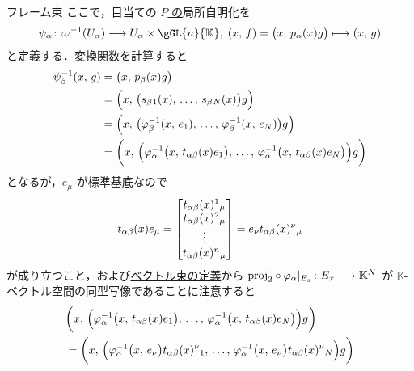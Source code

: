 \documentclass[TQFT_main]{subfiles}
\begin{document}
\begin{myexample}[label=def:framebundle]{フレーム束}
    ここで，目当ての \underline{$P$ の}局所自明化を
    \begin{align}
        \psi_\alpha \colon \varpi^{-1}(U_\alpha) \lto U_\alpha \times \gGL{n}{\mathbb{K}},\; (x,\, f) = \bigl(x,\, p_\alpha (x) g\bigr)\lmto (x,\, g)
    \end{align}
    と定義する．変換関数を計算すると
    \begin{align}
        \psi_\beta^{-1}(x,\, g) 
        &= \bigl(x,\, p_\beta (x) g\bigr) \\
        &= \Bigl(x,\, \bigl(s_\beta{}_1(x),\, \dots,\, s_\beta{}_N(x)\bigr) g\Bigr) \\
        &= \Bigl(x,\, \bigl(\varphi_\beta^{-1}(x,\, e_1),\, \dots,\, \varphi_\beta^{-1}(x,\, e_N)\bigr) g\Bigr) \\
        &= \biggl(x,\, \Bigl(\varphi_\alpha^{-1}\bigl(x,\, t_{\alpha\beta}(x) e_1\bigr),\, \dots,\, \varphi_\alpha^{-1}\bigl(x,\, t_{\alpha\beta}(x) e_N\bigr)\Bigr) g\biggr) 
    \end{align}
    となるが，$e_\mu$ が標準基底なので
    \begin{align}
        t_{\alpha\beta}(x) e_\mu = \mqty[t_{\alpha\beta}(x)^1{}_\mu \\ t_{\alpha\beta}(x)^2{}_\mu \\ \vdots \\ t_{\alpha\beta}(x)^n{}_\mu] = e_\nu t_{\alpha\beta}(x)^\nu{}_\mu
    \end{align}
    が成り立つこと，および\hyperref[def:vect]{ベクトル束の定義}から $\mathrm{proj}_2 \circ \varphi_\alpha|_{E_x} \colon E_x \longrightarrow \mathbb{K}^N$ が $\mathbb{K}$-ベクトル空間の同型写像であることに注意すると
    \begin{align}
        &\biggl(x,\, \Bigl(\varphi_\alpha^{-1}\bigl(x,\, t_{\alpha\beta}(x) e_1\bigr),\, \dots,\, \varphi_\alpha^{-1}\bigl(x,\, t_{\alpha\beta}(x) e_N\bigr)\Bigr) g\biggr) \\
        &= \biggl(x,\, \Bigl(\varphi_\alpha^{-1}\bigl(x,\, e_\nu\bigr) t_{\alpha\beta}(x)^\nu{}_1,\, \dots,\, \varphi_\alpha^{-1}\bigl(x,\, e_\nu\bigr)t_{\alpha\beta}(x)^\nu{}_N\Bigr) g\biggr) \\

\end{align}
\end{myexample}
\end{document}

